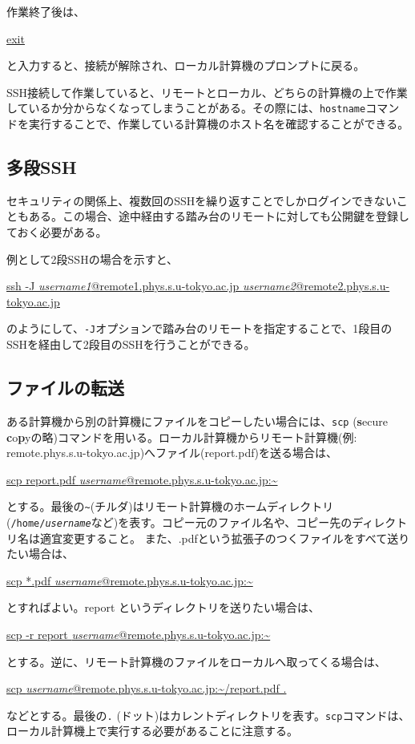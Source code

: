 作業終了後は、
\begin{commandline2}
    \prompt \underline{exit}
\end{commandline2} \noindent
と入力すると、接続が解除され、ローカル計算機のプロンプトに戻る。

SSH接続して作業していると、リモートとローカル、どちらの計算機の上で作業しているか分からなくなってしまうことがある。その際には、\texttt{hostname}コマンドを実行することで、作業している計算機のホスト名を確認することができる。

\subsection{多段SSH}

セキュリティの関係上、複数回のSSHを繰り返すことでしかログインできないこともある。この場合、途中経由する踏み台のリモートに対しても公開鍵を登録しておく必要がある。

例として2段SSHの場合を示すと、
\begin{commandline2}
    \prompt \underline{ssh -J \textit{username1}@remote1.phys.s.u-tokyo.ac.jp \textit{username2}@remote2.phys.s.u-tokyo.ac.jp}
\end{commandline2} \noindent
のようにして、\texttt{-J}オプションで踏み台のリモートを指定することで、1段目のSSHを経由して2段目のSSHを行うことができる。

\subsection{ファイルの転送}

ある計算機から別の計算機にファイルをコピーしたい場合には、\texttt{scp} (\textbf{s}ecure \textbf{c}o\textbf{p}yの略)コマンドを用いる。ローカル計算機からリモート計算機(例: remote.phys.s.u-tokyo.ac.jp)へファイル(report.pdf)を送る場合は、
\begin{commandline2}
    \prompt \underline{scp report.pdf \textit{username}@remote.phys.s.u-tokyo.ac.jp:\~{} }
\end{commandline2} \noindent
とする。最後の\texttt{\~{}}(チルダ)はリモート計算機のホームディレクトリ(\texttt{/home/\textit{username}}など)を表す。コピー元のファイル名や、コピー先のディレクトリ名は適宜変更すること。
また、.pdfという拡張子のつくファイルをすべて送りたい場合は、
\begin{commandline2}
    \prompt \underline{scp *.pdf \textit{username}@remote.phys.s.u-tokyo.ac.jp:\~{} }
\end{commandline2} \noindent
とすればよい。report というディレクトリを送りたい場合は、
\begin{commandline2}
    \prompt \underline{scp -r report \textit{username}@remote.phys.s.u-tokyo.ac.jp:\~{}}
\end{commandline2} \noindent
とする。逆に、リモート計算機のファイルをローカルへ取ってくる場合は、
\begin{commandline2}
    \prompt \underline{scp \textit{username}@remote.phys.s.u-tokyo.ac.jp:\~{}/report.pdf .}
\end{commandline2} \noindent
などとする。最後の\texttt{.} (ドット)はカレントディレクトリを表す。\texttt{scp}コマンドは、ローカル計算機上で実行する必要があることに注意する。

